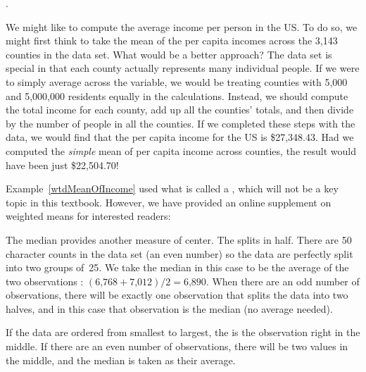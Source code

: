 .

\begin{example}{We might like to compute the average income per person in the US. To do so, we might first think to take the mean of the per capita incomes across the 3,143 counties in the  data set. What would be a better approach?} \label{wtdMeanOfIncome}
The  data set is special in that each county actually represents many individual people. If we were to simply average across the  variable, we would be treating counties with 5,000 and 5,000,000 residents equally in the calculations. Instead, we should compute the total income for each county, add up all the counties' totals, and then divide by the number of people in all the counties. If we completed these steps with the  data, we would find that the per capita income for the US is \$27,348.43. Had we computed the \emph{simple} mean of per capita income across counties, the result would have been just \$22,504.70!
\end{example}

Example~\ref{wtdMeanOfIncome} used what is called a , which will not be a key topic in this textbook. However, we have provided an online supplement on weighted means for interested readers:
\begin{center}
\end{center}

The median provides another measure of center.  The  splits  in half. There are 50 character counts in the  data set (an even number) so the data are perfectly split into two groups of~25. We take the median in this case to be the average of the two  observations : $(\text{6,768} + \text{7,012}) / 2 = \text{6,890}$. When there are an odd number of observations, there will be exactly one observation that splits the data into two halves, and in this case that observation is the median (no average needed).

\begin{termBox}{
If the data are ordered from smallest to largest, the  is the observation right in the middle. If there are an even number of observations, there will be two values in the middle, and the median is taken as their average.} 
\end{termBox}

